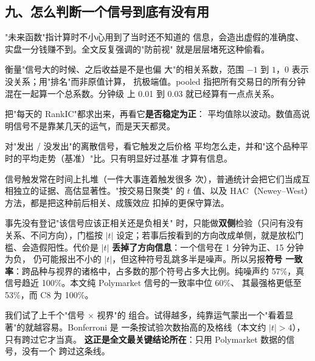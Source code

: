 \subsection{九、怎么判断一个信号到底有没有用}
\begin{description}[style=nextline, leftmargin=1em]
\item[防前视、未来函数] "未来函数"指计算时不小心用到了当时还不知道的
  信息，会造出虚假的准确度、实盘一分钱赚不到。全文反复强调的"防前视"
  就是层层堵死这种偷看。

\item[RankIC（秩相关）、pooled] 衡量"信号大的时候、之后收益是不是也偏
  大"的相关系数，范围 $-1$ 到 $1$，0 表示没关系；用"排名"而非原值计算，
  抗极端值。pooled 指把所有交易日的所有分钟混在一起算一个总系数。分钟级
  上 0.01 到 0.03 就已经算有一点点关系。

\item[ICIR] 把"每天的 RankIC"都求出来，再看它\textbf{是否稳定为正}：
  平均值除以波动。数值高说明信号不是靠某几天的运气，而是天天都灵。

\item[事件研究、基准] 对"发出 / 没发出"的离散信号，看它触发之后价格
  平均怎么走，并和"这个品种平时的平均走势（基准）"比。只有明显好过基准
  才算有信息。

\item[聚类稳健 $t$、HAC] 信号触发常在时间上扎堆（一件大事连着触发很多
  次），普通统计会把它们当成互相独立的证据、高估显著性。"按交易日聚类"
  的 $t$ 值、以及 HAC（Newey--West）方法，都是把这种前后相关、成簇效应
  扣掉的更保守算法。

\item[双侧检验与符号一致率] 事先没有登记"该信号应该正相关还是负相关"
  时，只能做\textbf{双侧}检验（只问有没有关系、不问方向），门槛按 $|t|$
  设定；若事后按看到的方向改成单侧，就是放松门槛、会造假阳性。代价是
  $|t|$ \textbf{丢掉了方向信息}：一个信号在 1 分钟为正、15 分钟为负，
  仍可能报出不小的 $|t|$，但这种符号乱跳多半是噪声。所以另报\textbf{符号
  一致率}：跨品种与视界的诸格中，占多数的那个符号占多大比例。纯噪声约
  57\%，真信号趋近 100\%。本文纯 Polymarket 信号的一致率中位 60\%、
  其最强格更低至 53\%，而 C8 为 100\%。

\item[多重检验、Bonferroni 门槛] 我们试了上千个"信号 $\times$ 视界"的
  组合。试得越多，纯靠运气蒙出一个"看着显著"的就越容易。Bonferroni 是
  一条按试验次数抬高的及格线（本文约 $|t|>4$），只有跨过它才当真。
  \textbf{这正是全文最关键结论所在}：只用 Polymarket 数据的信号，没有一个
  跨过这条线。


\end{description}
